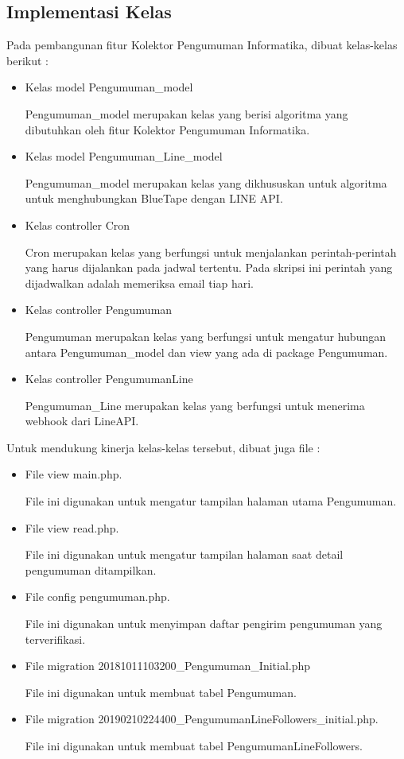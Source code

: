 \subsection{Implementasi Kelas}
Pada pembangunan fitur Kolektor Pengumuman Informatika, dibuat kelas-kelas berikut : 
\begin{itemize}
\item Kelas model Pengumuman\_model

Pengumuman\_model merupakan kelas yang berisi algoritma yang dibutuhkan oleh fitur Kolektor Pengumuman Informatika.

\item Kelas model Pengumuman\_Line\_model

Pengumuman\_model merupakan kelas yang dikhususkan untuk algoritma untuk menghubungkan BlueTape dengan LINE API.

\item Kelas controller Cron

Cron merupakan kelas yang berfungsi untuk menjalankan perintah-perintah yang harus dijalankan pada jadwal tertentu. Pada skripsi ini perintah yang dijadwalkan adalah memeriksa email tiap hari.

\item Kelas controller Pengumuman

Pengumuman merupakan kelas yang berfungsi untuk mengatur hubungan antara Pengumuman\_model dan view yang ada di package Pengumuman.

\item Kelas controller PengumumanLine

Pengumuman\_Line merupakan kelas yang berfungsi untuk menerima webhook dari LineAPI.

\end{itemize}

Untuk mendukung kinerja kelas-kelas tersebut, dibuat juga file :
\begin{itemize}
\item File view main.php.

File ini digunakan untuk mengatur tampilan halaman utama Pengumuman.

\item File view read.php.

File ini digunakan untuk mengatur tampilan halaman saat detail pengumuman ditampilkan.

\item File config pengumuman.php.

File ini digunakan untuk menyimpan daftar pengirim pengumuman yang terverifikasi.

\item File migration 20181011103200\_Pengumuman\_Initial.php 

File ini digunakan untuk membuat tabel Pengumuman.

\item File migration 20190210224400\_PengumumanLineFollowers\_initial.php.

File ini digunakan untuk membuat tabel PengumumanLineFollowers.
\end{itemize}


